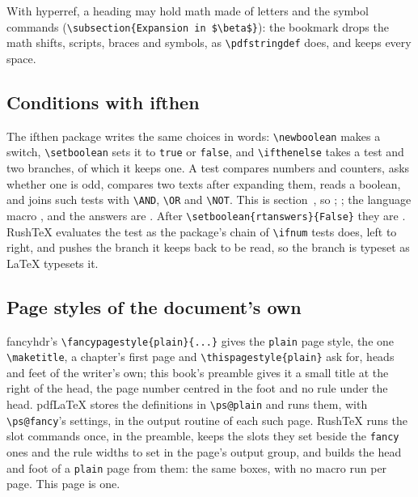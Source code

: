 \documentclass{article}
\numberwithin{equation}{section}
\theoremstyle{definition}
\theoremstyle{remark}
\begin{document}
\medskip
With hyperref, a heading may hold math made of letters and the symbol commands
(\verb|\subsection{Expansion in $\beta$}|): the bookmark drops the math shifts, scripts,
braces and symbols, as \verb|\pdfstringdef| does, and keeps every space.

\subsection{Conditions with ifthen}\label{sec:ifthen}
\newcommand{\rtlang}{en}%
The ifthen package writes the same choices in words: \verb|\newboolean| makes a switch,
\verb|\setboolean| sets it to \texttt{true} or \texttt{false}, and \verb|\ifthenelse|
takes a test and two branches, of which it keeps one. A test compares numbers and
counters, asks whether one is odd, compares two texts after expanding them, reads a
boolean, and joins such tests with \verb|\AND|, \verb|\OR| and \verb|\NOT|. This is
section~\thesection, so ; ; the language macro \ifthenelse{\equal{\rtlang}{en}}{reads en}{reads another}, and the
answers are .
After \verb|\setboolean{rtanswers}{False}| they are
. RushTeX evaluates the test as the
package's chain of \verb|\ifnum| tests does, left to right, and pushes the branch it keeps
back to be read, so the branch is typeset as \LaTeX{} typesets it.

\subsection{Page styles of the document's own}\label{sec:fancyplain}
fancyhdr's \verb|\fancypagestyle{plain}{...}| gives the \texttt{plain} page style, the
one \verb|\maketitle|, a chapter's first page and \verb|\thispagestyle{plain}| ask for,
heads and feet of the writer's own; this book's preamble gives it a small title at the
right of the head, the page number centred in the foot and no rule under the head. pdfLaTeX
stores the definitions in \verb|\ps@plain| and runs them, with
\verb|\ps@fancy|'s settings, in the output routine of each such page. RushTeX runs the
slot commands once, in the preamble, keeps the slots they set beside the
\texttt{fancy} ones and the rule widths to set in the page's output group, and builds the
head and foot of a \texttt{plain} page from them: the same boxes, with no macro run per
page. This page is one.\thispagestyle{plain}
\end{document}
